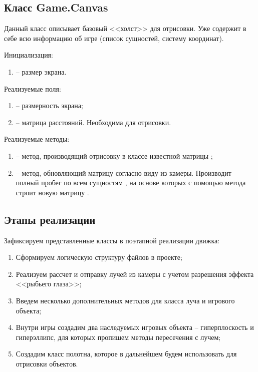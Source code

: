 \subsection{Класс Game.Canvas}

	Данный класс описывает базовый <<холст>> для отрисовки. Уже содержит в себе всю информацию об игре (список сущностей, систему координат).

	\noindent Инициализация:
	\begin{enumerate}
		\item {} -- размер экрана.
	\end{enumerate}

	\noindent Реализуемые поля:
	\begin{enumerate}
		\item {} -- размерность экрана;
		\item {} -- матрица расстояний. Необходима для отрисовки.
	\end{enumerate}

	\noindent Реализуемые методы:
	\begin{enumerate}
		\item {} -- метод, производящий отрисовку в классе  известной матрицы ;
		\item {} -- метод, обновляющий матрицу  согласно виду из камеры. Производит полный пробег по всем сущностям , на основе которых с помощью метода  строит новую матрицу .
	\end{enumerate}


\subsection{Этапы реализации}

	Зафиксируем представленные классы в поэтапной реализации движка:
	\begin{enumerate}
		\item Сформируем логическую структуру файлов в проекте;
		\item Реализуем рассчет и отправку лучей из камеры с учетом разрешения эффекта <<рыбьего глаза>>;
		\item Введем несколько дополнительных методов для класса луча и игрового объекта;
		\item Внутри игры создадим два наследуемых игровых объекта -- гиперплоскость и гиперэллипс, для которых пропишем методы пересечения с лучем;
		\item Создадим класс полотна, которое в дальнейшем будем использовать для отрисовки объектов.
	\end{enumerate}

